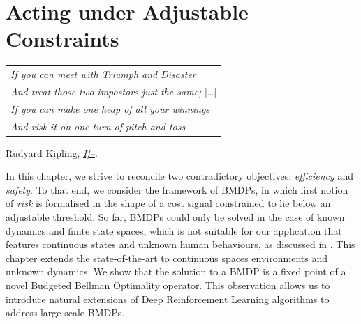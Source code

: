 
\graphicspath{{2-Chapters/5-Chapter/}}

\chapter{Acting under Adjustable Constraints}
\label{chapter:5}

\begin{flushright}
	\begin{tabular}{@{}l@{}}
		\emph{If you can meet with Triumph and Disaster}\\
		\emph{And treat those two impostors just the same;} [\dots]\\
		\emph{If you can make one heap of all your winnings}\\
		\emph{And risk it on one turn of pitch-and-toss}\\
	\end{tabular}

	Rudyard Kipling, \href{https://eleurent.github.io/sisyphe/texts/if-.html}{\emph{If--}}.
\end{flushright}

%


\abstractStartChapter{}%
In this chapter, we strive to reconcile two contradictory objectives: \textit{efficiency} and \textit{safety}. To that end, we consider the framework of \glspl{BMDP}, in which first notion of \textit{risk} is formalised in the shape of a cost signal constrained to lie below an adjustable threshold.  So far, \glspl{BMDP} could only be solved in the case of known dynamics and finite state spaces, which is not suitable for our application that features continuous states and unknown human behaviours, as discussed in . This chapter extends the state-of-the-art to continuous spaces environments and unknown dynamics. We show that the solution to a \gls{BMDP} is a fixed point of a novel Budgeted Bellman Optimality operator. This observation allows us to introduce natural extensions of Deep Reinforcement Learning algorithms to address large-scale \glspl{BMDP}.
\minitocStartChapter{}

